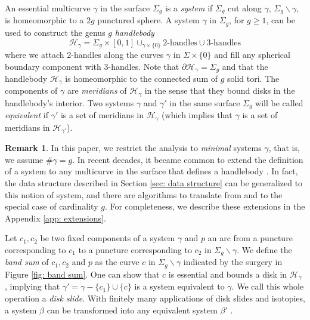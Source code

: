 \documentclass[11pt]{amsart}
\numberwithin{equation}{section}
\theoremstyle{plain}
\theoremstyle{definition}
\newtheorem{remark}[equation]{Remark}
\begin{document}
An essential multicurve $\gamma$ in the surface $\Sigma_g$ is a \textit{system} if $\Sigma_g$ cut along $\gamma$, $\Sigma_g\backslash \gamma$, is homeomorphic to a $2g$ punctured sphere. 
A system $\gamma$ in $\Sigma_g$, for $g\geq 1$, can be used to construct the genus $g$ \textit{handlebody}
\begin{equation*}
    \mathcal{H}_\gamma = \Sigma_g\times [0,1]\cup_{\gamma \times \{0\}} 2\text{-handles}\cup 3 \text{-handles}
\end{equation*}
where we attach 2-handles along the curves $\gamma$ in $\Sigma\times \{0\}$ and fill any spherical boundary component with 3-handles. 
Note that $\partial\mathcal{H}_\gamma=\Sigma_g$ and that the handlebody $\mathcal{H}_\gamma$ is homeomorphic to the connected sum of $g$ solid tori.
The components of $\gamma$ are \textit{meridians} of $\mathcal{H}_\gamma$ in the sense that they bound disks in the handlebody's interior. 
Two systems $\gamma$ and $\gamma'$ in the same surface $\Sigma_g$ will be called \textit{equivalent} if $\gamma'$ is a set of meridians in $\mathcal{H}_\gamma$ (which implies that $\gamma$ is a set of meridians in $\mathcal{H}_{\gamma'}$).

\begin{remark}\label{rm: systems}
    In this paper, we restrict the analysis to \emph{minimal} systems $\gamma$, that is, we assume $\#\gamma=g$.
    In recent decades, it became common to extend the definition of a system to any multicurve in the surface that defines a handlebody \cite{hempel20013, yoshizawa2014high}.
    In fact, the data structure described in Section \ref{sec: data structure} can be generalized to this notion of system, and there are algorithms to translate from and to the special case of cardinality $g$.
    For completeness, we describe these extensions in the Appendix \ref{app: extensions}.
\end{remark}

Let $c_1,c_2$ be two fixed components of a system $\gamma$ and $p$ an arc from a puncture corresponding to $c_1$ to a puncture corresponding to $c_2$ in $\Sigma_g\backslash \gamma$. 
We define the \emph{band sum} of $c_1,c_2$ and $p$ as the curve $c$ in $\Sigma_g\backslash \gamma$ indicated by the surgery in Figure \ref{fig: band sum}. 
One can show that $c$ is essential and bounds a disk in $\mathcal{H}_\gamma$ \cite{ennes2025hardnesscomputationquantuminvariants, johnson2006notes}, implying that $\gamma'=\gamma-\{c_1\}\cup \{c\}$ is a system equivalent to $\gamma$. 
We call this whole operation a \emph{disk slide}.
With finitely many applications of disk slides and isotopies, a system $\beta$ can be transformed into any equivalent system $\beta'$ \cite{johnson2006notes}. 
\end{document}
